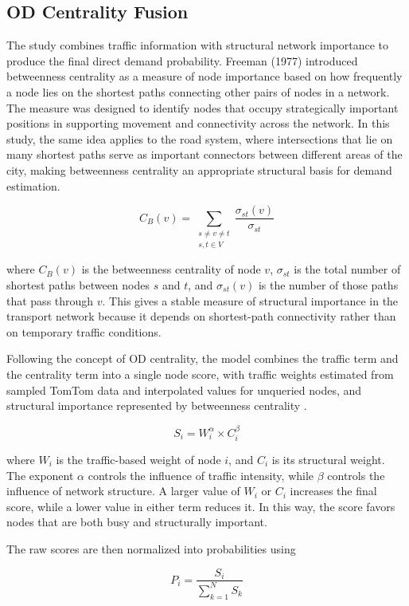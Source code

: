 {\subsection{OD Centrality Fusion}
\noindent The study combines traffic information with structural network importance to produce the final direct demand probability. Freeman (1977) introduced betweenness centrality as a measure of node importance based on how frequently a node lies on the shortest paths connecting other pairs of nodes in a network. The measure was designed to identify nodes that occupy strategically important positions in supporting movement and connectivity across the network. In this study, the same idea applies to the road system, where intersections that lie on many shortest paths serve as important connectors between different areas of the city, making betweenness centrality an appropriate structural basis for demand estimation.

\[
C_B(v) =
\sum_{\substack{s \neq v \neq t \\ s,t \in V}}
\frac{\sigma_{st}(v)}{\sigma_{st}}
\]

where \(C_B(v)\) is the betweenness centrality of node \(v\), \(\sigma_{st}\) is the total number of shortest paths between nodes \(s\) and \(t\), and \(\sigma_{st}(v)\) is the number of those paths that pass through \(v\). This gives a stable measure of structural importance in the transport network because it depends on shortest-path connectivity rather than on temporary traffic conditions.

Following the concept of \ac{OD} centrality, the model combines the traffic term and the centrality term into a single node score, with traffic weights estimated from sampled TomTom data and interpolated values for unqueried nodes, and structural importance represented by betweenness centrality \citep{Lowry2014}.

\[
S_i = W_i^{\alpha} \times C_i^{\beta}
\]

where \(W_i\) is the traffic-based weight of node \(i\), and \(C_i\) is its structural weight. The exponent \(\alpha\) controls the influence of traffic intensity, while \(\beta\) controls the influence of network structure. A larger value of \(W_i\) or \(C_i\) increases the final score, while a lower value in either term reduces it. In this way, the score favors nodes that are both busy and structurally important.

The raw scores are then normalized into probabilities using

\[
P_i = \frac{S_i}{\sum_{k=1}^{N} S_k}
\]

}
